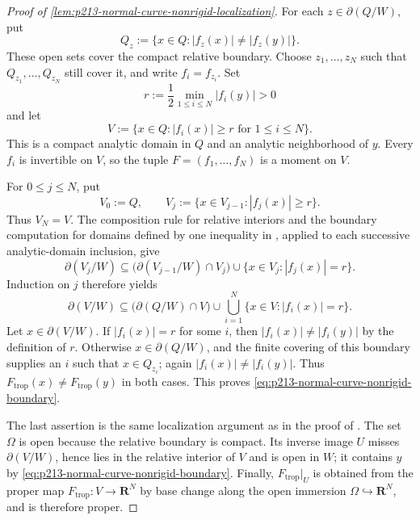 \begin{proof}[Proof of
\cref{lem:p213-normal-curve-nonrigid-localization}]
For each $z\in\partial(Q/W)$, put
\[
 Q_z:=\{x\in Q:|f_z(x)|\ne|f_z(y)|\}.
\]
These open sets cover the compact relative boundary.  Choose
$z_1,\ldots,z_N$ such that $Q_{z_1},\ldots,Q_{z_N}$ still cover it, and
write $f_i=f_{z_i}$.  Set
\[
                 r:=\frac12\min_{1\le i\le N}|f_i(y)|>0
\]
and let
\[
                 V:=\{x\in Q:|f_i(x)|\ge r
                              \text{ for }1\le i\le N\}.
\]
This is a compact analytic domain in $Q$ and an analytic neighborhood of
$y$.  Every $f_i$ is invertible on $V$, so the tuple
$F=(f_1,\ldots,f_N)$ is a moment on $V$.

For $0\leq j\leq N$, put
\[
 V_0:=Q,
 \qquad
 V_j:=\{x\in V_{j-1}:|f_j(x)|\geq r\}.
\]
Thus $V_N=V$.  The composition rule for relative interiors and the
boundary computation for domains defined by one inequality in
\cite[\S\S11.4.1--11.4.2]{CLD25}, applied to each successive
analytic-domain inclusion, give
\[
 \partial(V_j/W)
 \subseteq
 \bigl(\partial(V_{j-1}/W)\cap V_j\bigr)
 \cup\{x\in V_j:|f_j(x)|=r\}.
\]
Induction on $j$ therefore yields
\[
 \partial(V/W)
 \subseteq
 \bigl(\partial(Q/W)\cap V\bigr)
 \cup\bigcup_{i=1}^N\{x\in V:|f_i(x)|=r\}.
\]
Let $x\in\partial(V/W)$.  If $|f_i(x)|=r$ for some $i$, then
$|f_i(x)|\ne|f_i(y)|$ by the definition of $r$.  Otherwise
$x\in\partial(Q/W)$, and the finite covering of this boundary supplies an
$i$ such that $x\in Q_{z_i}$; again
$|f_i(x)|\ne|f_i(y)|$.  Thus
$F_{\mathrm{trop}}(x)\ne F_{\mathrm{trop}}(y)$ in both cases.  This proves
\eqref{eq:p213-normal-curve-nonrigid-boundary}.

The last assertion is the same localization argument as in the proof of
\cite[Lemma~12.3.6 and Theorem~16.8.5]{CLD25}.  The set $\Omega$ is open
because the relative boundary is compact.  Its inverse image $U$ misses
$\partial(V/W)$, hence lies in the relative interior of $V$ and is open in
$W$; it contains $y$ by
\eqref{eq:p213-normal-curve-nonrigid-boundary}.  Finally,
$F_{\mathrm{trop}}|_U$ is obtained from the proper map
$F_{\mathrm{trop}}:V\to\mathbf R^N$ by base change along the open immersion
$\Omega\hookrightarrow\mathbf R^N$, and is therefore proper.
\end{proof}
